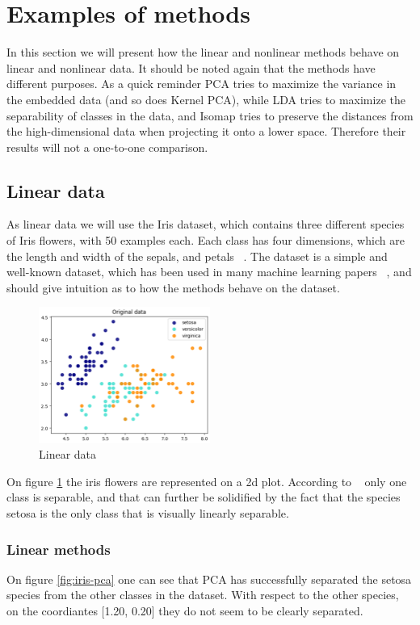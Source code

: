 \section{Examples of methods}
In this section we will present how the linear and nonlinear methods behave on linear and nonlinear data. It should be noted again that the methods have different purposes. As a quick reminder PCA tries to maximize the variance in the embedded data (and so does Kernel PCA), while LDA tries to maximize the separability of classes in the data, and Isomap tries to preserve the distances from the high-dimensional data when projecting it onto a lower space. Therefore their results will not a one-to-one comparison.


\subsection{Linear data}
As linear data we will use the Iris dataset, which contains three different species of Iris flowers, with 50 examples each. Each class has four dimensions, which are the length and width of the sepals, and petals ~\cite{iris-dataset}. The dataset is a simple and well-known dataset, which has been used in many machine learning papers ~\cite{iris-dataset}, and should give intuition as to how  the methods behave on the dataset.

\begin{figure}[h]
\centering
\includegraphics[width=0.5\textwidth]{figures/theory-example-figures/linear-data.png}
\caption{Linear data}
\label{fig:linear-data}
\end{figure}

On figure \ref{fig:linear-data} the iris flowers are represented on a 2d plot. According to ~\cite{iris-dataset} only one class is separable, and that can further be  solidified by the fact that the species setosa is the only class that is visually linearly separable.

\subsubsection{Linear methods}
On figure \ref{fig:iris-pca} one can see that PCA has successfully separated the setosa species from the other classes in the dataset. With respect to the other species, on the coordiantes [1.20, 0.20] they do not seem to be clearly separated.

